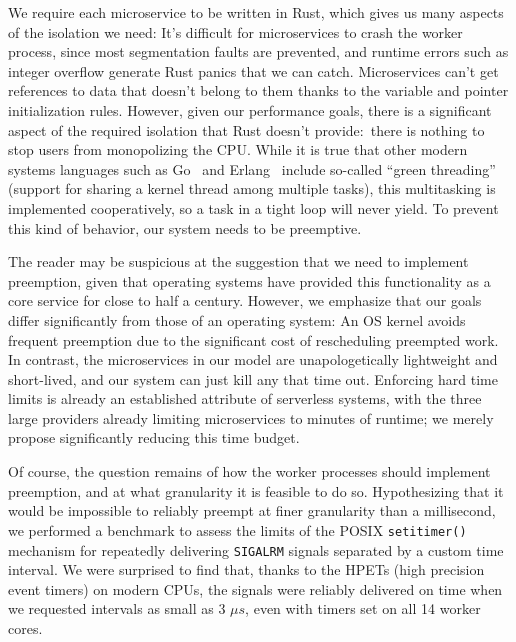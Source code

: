 We require each microservice to be written in Rust, which gives us many aspects of
the isolation we need:  It's difficult for microservices to crash the worker process,
since most segmentation faults are prevented, and runtime errors such as integer
overflow generate Rust panics that we can catch.  Microservices can't get references
to data that doesn't belong to them thanks to the variable and pointer initialization
rules.  However, given our performance goals, there is a significant aspect of the
required isolation that Rust doesn't provide:\ there is nothing to stop users from
monopolizing the CPU.  While it is true that other modern systems languages such as
Go~\cite{www-golang} and Erlang~\cite{www-erlang} include so-called ``green
threading'' (support for sharing a kernel thread among multiple tasks), this
multitasking is implemented cooperatively, so a task in a tight loop will never
yield.  To prevent this kind of behavior, our system needs to be preemptive.

The reader may be suspicious at the suggestion that we need to implement preemption,
given that operating systems have provided this functionality as a core service for
close to half a century.  However, we emphasize that our goals differ significantly
from those of an operating system:  An OS kernel avoids frequent preemption due to
the significant cost of rescheduling preempted work.  In contrast, the microservices
in our model are unapologetically lightweight and short-lived, and our system can
just kill any that time out.  Enforcing hard time limits is already an established
attribute of serverless systems, with the three large providers already limiting
microservices to minutes of runtime; we merely propose significantly reducing this
time budget.

Of course, the question remains of how the worker processes should implement
preemption, and at what granularity it is feasible to do so.  Hypothesizing that it
would be impossible to reliably preempt at finer granularity than a millisecond, we
performed a benchmark to assess the limits of the POSIX \texttt{setitimer()}
mechanism for repeatedly delivering \texttt{SIGALRM} signals separated by a custom
time interval.  We were surprised to find that, thanks to the HPETs (high precision
event timers) on modern CPUs, the signals were reliably delivered on time when we
requested intervals as small as 3 $\mu{}s$, even with timers set on all 14 worker
cores.

